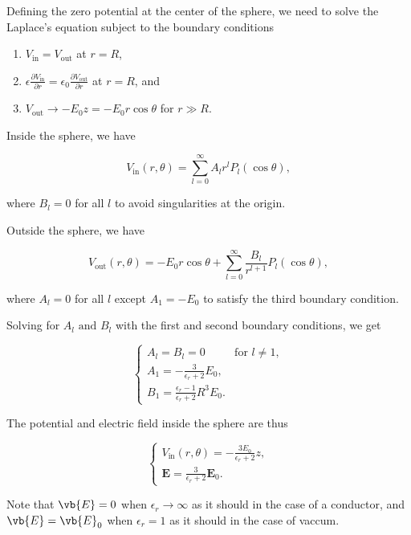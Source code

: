 \documentclass[english,a4paper,12pt]{report}
\begin{document}
{Defining the zero potential at the center of the sphere, we need to solve the Laplace's equation subject to the boundary conditions

\begin{enumerate}[itemsep=10pt] 
    \item $V_{\text{in}} = V_{\text{out}}$ at $r = R$,
    \item $\displaystyle \epsilon \frac{\partial V_{\text{in}}}{\partial r} = \epsilon_0 \frac{\partial V_{\text{out}}}{\partial r}$ at $r = R$, and
    \item $V_{\text{out}} \to -E_0 z = -E_0 r \cos\theta$ for $r \gg R$.
\end{enumerate}

Inside the sphere, we have

\begin{equation}
    V_{\text{in} }(r, \theta ) = \sum_{l=0}^{\infty} A_{l} r^{l}P_{l}(\cos \theta ),
\end{equation}

where \(B_{l} = 0\) for all \(l\) to avoid singularities at the origin. 

Outside the sphere, we have

\begin{equation}
    V_{\text{out} }(r,\theta ) = -E_0 r\cos \theta + \sum_{l=0}^{\infty}\frac{B_{l} }{r^{l+1} }P_{l}(\cos \theta ),   
\end{equation}

where \(A_{l} = 0 \) for all \(l\) except \(A_1 = -E_0 \) to satisfy the third boundary condition.

Solving for \(A_{l} \text { and } B_{l}  \) with the first and second boundary conditions, we get 

\begin{equation}
    \begin{cases}
        A_l = B_l = 0 & \text{for } l \neq 1, \\[10pt]
        A_1 = \displaystyle -\frac{3}{\epsilon_r + 2} E_0, \\[10pt]
        B_1 = \displaystyle \frac{\epsilon_r - 1}{\epsilon_r + 2} R^3 E_0.
        \end{cases}   
\end{equation}

The potential and electric field inside the sphere are thus

\begin{equation}
    \begin{cases}
        V_\text{in}(r, \theta) = \displaystyle -\frac{3 E_0}{\epsilon_r + 2} z, \\[10pt]
        \mathbf{E} = \displaystyle \frac{3}{\epsilon_r + 2} \mathbf{E}_0.
        \end{cases}
\end{equation}

Note that \(\vb{E} = 0\) when \(\epsilon _{r} \to \infty\) as it should in the case of a conductor, and \(\vb{E} = \vb{E} _{0} \) when \(\epsilon _{r} = 1 \) as it should in the case of vaccum.    
} 
\end{document}
